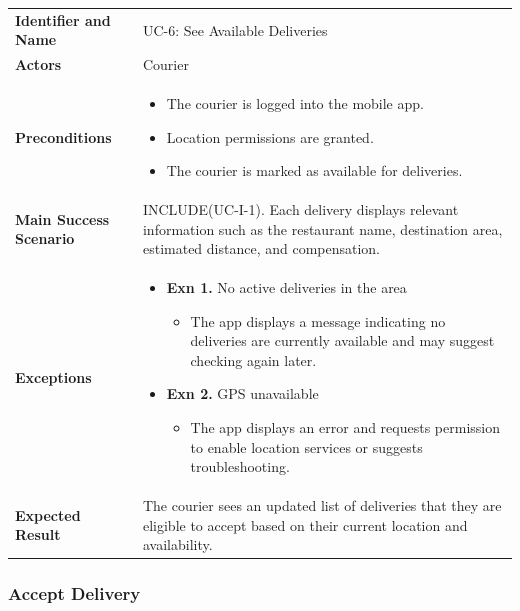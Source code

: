 \noindent
\begin{tabularx}{\textwidth}{l X}
    \textbf{Identifier and Name} & UC-6: See Available Deliveries \\
    \textbf{Actors} & Courier \\
    \textbf{Preconditions} & 
    \begin{itemize} 
        \item The courier is logged into the mobile app.
        \item Location permissions are granted.
        \item The courier is marked as available for deliveries.
    \end{itemize} \\
    \textbf{Main Success Scenario} & INCLUDE(UC-I-1). Each delivery displays relevant information such as the restaurant name, destination area, estimated distance, and compensation. \\
    \textbf{Exceptions} & 
    \begin{itemize} 
        \item \textbf{Exn 1.} No active deliveries in the area
        \begin{itemize}
            \item The app displays a message indicating no deliveries are currently available and may suggest checking again later.
        \end{itemize}
        \item \textbf{Exn 2.} GPS unavailable
        \begin{itemize}
            \item The app displays an error and requests permission to enable location services or suggests troubleshooting.
        \end{itemize}
    \end{itemize} \\
    \textbf{Expected Result} & The courier sees an updated list of deliveries that they are eligible to accept based on their current location and availability.
\end{tabularx}

\subsubsection{Accept Delivery}

